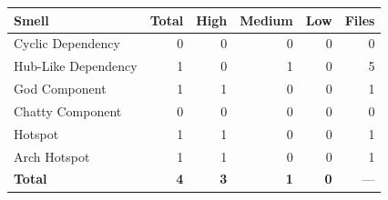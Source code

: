 \begin{tabular}{l|r|r|r|r|r}
\hline
\textbf{Smell} & \textbf{Total} & \textbf{High} & \textbf{Medium} & \textbf{Low} & \textbf{Files} \\
\hline
Cyclic Dependency & 0 & 0 & 0 & 0 & 0 \\
Hub-Like Dependency & 1 & 0 & 1 & 0 & 5 \\
God Component & 1 & 1 & 0 & 0 & 1 \\
Chatty Component & 0 & 0 & 0 & 0 & 0 \\
Hotspot & 1 & 1 & 0 & 0 & 1 \\
Arch Hotspot & 1 & 1 & 0 & 0 & 1 \\
\hline
\textbf{Total}       & \textbf{4} & \textbf{3} & \textbf{1} & \textbf{0} & --- \\
\hline
\end{tabular}